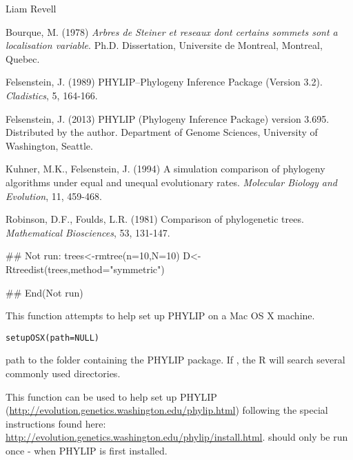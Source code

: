 \documentclass[a4paper]{book}
\begin{document}
%
\begin{Author}\relax
Liam Revell 
\end{Author}
%
\begin{References}\relax
Bourque, M. (1978) \emph{Arbres de Steiner et reseaux dont certains sommets sont a localisation variable}. Ph.D. Dissertation, Universite de Montreal, Montreal, Quebec.

Felsenstein, J. (1989) PHYLIP--Phylogeny Inference Package (Version 3.2). \emph{Cladistics}, 5, 164-166.

Felsenstein, J. (2013) PHYLIP (Phylogeny Inference Package) version 3.695. Distributed by the author. Department of Genome Sciences, University of Washington, Seattle.

Kuhner, M.K., Felsenstein, J. (1994) A simulation comparison of phylogeny algorithms under equal and unequal evolutionary rates. \emph{Molecular Biology and Evolution}, 11, 459-468.

Robinson, D.F., Foulds, L.R. (1981) Comparison of phylogenetic trees. \emph{Mathematical Biosciences}, 53, 131-147.
\end{References}
%
\begin{Examples}
\begin{ExampleCode}
## Not run: 
trees<-rmtree(n=10,N=10)
D<-Rtreedist(trees,method="symmetric")

## End(Not run)
\end{ExampleCode}
\end{Examples}
%
\begin{Description}\relax
This function attempts to help set up PHYLIP on a Mac OS X machine.
\end{Description}
%
\begin{Usage}
\begin{verbatim}
setupOSX(path=NULL)
\end{verbatim}
\end{Usage}
%
\begin{Arguments}
\begin{ldescription}
\item[\code{path}] path to the folder containing the PHYLIP package. If , the R will search several commonly used directories.
\end{ldescription}
\end{Arguments}
%
\begin{Details}\relax
This function can be used to help set up PHYLIP (\url{http://evolution.genetics.washington.edu/phylip.html}) following the special instructions found here: \url{http://evolution.genetics.washington.edu/phylip/install.html}.  should only be run once - when PHYLIP is first installed.
\end{Details}
\end{document}
